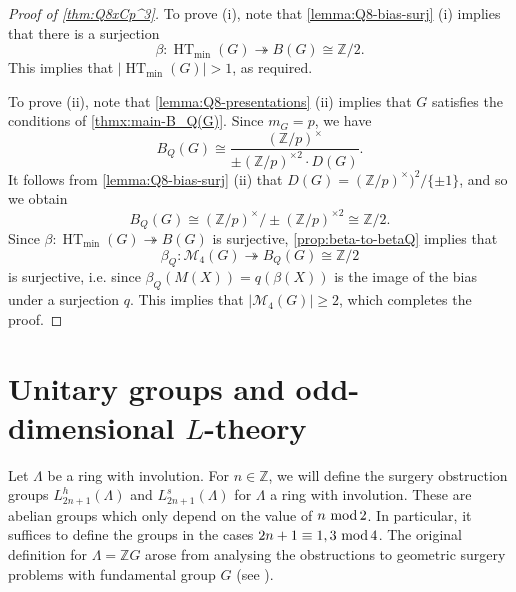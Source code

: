 \documentclass[11pt,a4paper,leqno]{amsart}
\theoremstyle{definition}
\theoremstyle{remark}
\renewcommand{\thesubsection}{\text{\thesection\alph{subsection}}}
\newcommand{\Z}{\mathbb{Z}}
\renewcommand{\mod}{\,\,\text{\normalfont mod}\,}
\DeclareMathOperator{\HT}{HT}
\renewcommand{\l}{\Lambda}
\newcommand{\sM}{\mathscr{M}}
\newcommand{\La}{\Lambda}
\newcommand{\bZ}{\mathbb Z}
\newcommand{\ZG}{\bZ G}
\begin{document}
\begin{proof}[Proof of \cref{thm:Q8xCp^3}]
To prove (i), note that \cref{lemma:Q8-bias-surj} (i) implies that there is a surjection 
\[ \beta\colon\HT_{\min}(G) \twoheadrightarrow B(G) \cong \Z/2.\] 
This implies that $|\HT_{\min}(G)| > 1$, as required.

To prove (ii), note that \cref{lemma:Q8-presentations} (ii) implies that $G$ satisfies the conditions of \cref{thmx:main-B_Q(G)}. Since $m_G = p$, we have 
\[ B_Q(G) \cong \frac{(\Z/p)^\times}{\pm(\Z/p)^{\times 2} \cdot D(G)}. \] 
It follows from \cref{lemma:Q8-bias-surj} (ii) that $D(G) = (\Z/p)^\times)^2/\{\pm 1\}$, and so we obtain
\[ B_Q(G) \cong (\Z/p)^\times / \pm(\Z/p)^{\times 2} \cong \Z/2. \]
Since $\beta\colon\HT_{\min}(G) \twoheadrightarrow B(G)$ is surjective, \cref{prop:beta-to-betaQ} implies that 
\[ \beta_Q\colon\sM_{4}(G) \twoheadrightarrow B_Q(G) \cong \Z/2\] 
is surjective, i.e. since $\beta_Q(M(X)) = q(\beta(X))$ is the image of the bias under a surjection $q$.
This implies that $|\sM_{4}(G)| \ge 2$, which completes the proof.
\end{proof}

\appendix

\section{Unitary groups and odd-dimensional $L$-theory}
\label{ss:L-odd}

\renewcommand{\thesubsection}{\thesection(\roman{subsection})}
\renewcommand{\thetheorem}{\thesection\arabic{theorem}}

Let $\l$ be a ring with involution. For $n \in \Z$, we will define the
surgery obstruction groups $L_{2n+1}^h(\l)$ and $L_{2n+1}^s(\l)$ for $\La$ a ring with involution. 
These are abelian groups which only depend on the value of $n \mod 2$. In particular, it suffices to define the groups in the cases $2n+1 \equiv  1, 3 \mod 4$. The original definition for $\La = \ZG$ arose from analysing the obstructions to geometric surgery problems with fundamental group $G$
(see \cite[Chapter 6]{Wall:1970}).
\end{document}
